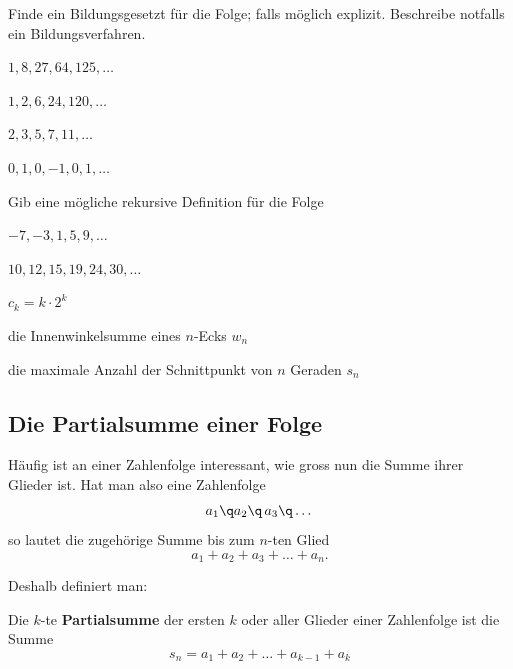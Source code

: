 \documentclass[%
11pt,%
twoside,%
titlepage,%
german,%
headsepline%
]{scrartcl}
\begin{document}
\begin{ueb}
Finde ein Bildungsgesetzt f\"ur die Folge; falls m\"oglich explizit. Beschreibe notfalls ein Bildungsverfahren.

\begin{minipage}{0.4\textwidth}
\begin{enumeratea}
\item $1,8,27,64,125,\dots$
\item $1,2,6,24,120,\dots$
\end{enumeratea}
\end{minipage}
\begin{minipage}{0.4\textwidth}
\begin{enumeratea}
\setcounter{enumi}{2}
\item $2,3,5,7,11,\dots$
\item $0,1,0,-1,0,1,\dots$
\end{enumeratea}
\end{minipage}
\end{ueb}

\begin{ueb}
Gib eine m\"ogliche rekursive Definition f\"ur die Folge
\begin{enumeratea}
\item $-7,-3,1,5,9,\dots$
\item $10,12,15,19,24,30,\dots$
\item $c_k=k\cdot2^k$
\item die Innenwinkelsumme eines $n$-Ecks $w_n$
\item die maximale Anzahl der Schnittpunkt von $n$ Geraden $s_n$
\end{enumeratea}
\end{ueb}

\subsection{Die Partialsumme einer Folge}
H\"aufig ist an einer Zahlenfolge interessant, wie gross nun die Summe ihrer Glieder ist.
Hat man also eine Zahlenfolge
$$a_1\q a_2 \q\, a_3\q \dots$$
so lautet die zugeh\"orige Summe bis zum $n$-ten Glied
$$a_1+a_2+a_3+\dots+a_n.$$

Deshalb definiert man:
\pagebreak
\begin{cdef}[Partialsumme]{}
Die
$k$-te \textbf{Partialsumme} der ersten $k$ oder aller Glieder einer Zahlenfolge ist die Summe
$$s_n=a_1+a_2+\ldots+a_{k-1}+a_k$$
\end{cdef}
\end{document}
